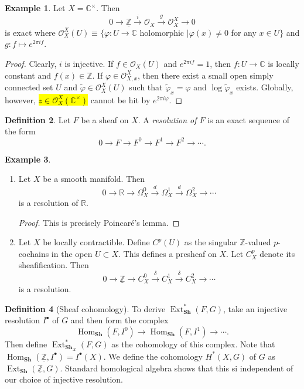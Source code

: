 \documentclass[10pt,letterpaper,cm]{nupset}
\theoremstyle{definition}
\newtheorem{definition}{Definition}[subsection]
\newtheorem{exmp}[definition]{Example}
\theoremstyle{theorem}
\theoremstyle{remark}
\newcommand{\C}{\mathbb C}
\newcommand{\R}{\mathbb{R}}
\newcommand{\Z}{\mathbb Z}
\newcommand{\1}{\mathbb{1}}
\newcommand{\0}{\vec 0}
\DeclareMathOperator{\ext}{Ext}
\DeclareMathOperator{\Hom}{Hom}
\begin{document}
\begin{exmp}
 Let $X = \C^{\times}$. Then $$ 0 \to \underline{\Z} \overset{i}{\longrightarrow} \mathcal{O}_X \overset{g}{\longrightarrow} \mathcal{O}_X^X \to 0$$ is exact where $\mathcal{O}_X^X(U) \equiv \{ \varphi : U \to \C$ holomorphic $\mid \varphi(x) \ne 0$ for any $x\in U\}$ and $g : f \mapsto e^{2\pi i f}$.
\end{exmp}
\begin{proof}
Clearly, $i$ is injective. If $f \in \mathcal{O}_X(U)$ and $e^{2\pi i f} =1$, then $f : U \to \C$ is locally constant and $f(x) \in \Z$. If $\varphi \in \mathcal{O}_{X,x}^X$, then there exist a small open simply connected set $U$ and $\tilde{\varphi} \in \mathcal{O}_X^X(U)$ such that $\tilde{\varphi}_x = \varphi$ and $\log{\tilde{\varphi}_x}$ exists. Globally, however, \hl{$z\in \mathcal{O}_X^X(\C^{\times})$} cannot be hit by $e^{2\pi i \varphi}$.
\end{proof}

\begin{definition}
Let $F$ be a sheaf on $X$. A \textit{resolution of $F$} is an exact sequence of the form $$0 \to F \to F^0 \to F^1 \to F^2 \to \cdots .$$
\end{definition}

\begin{exmp} $ $
\begin{enumerate}
\item Let $X$ be a smooth manifold. Then $$0 \to \R \to \Omega_X^0 \overset{d}{\longrightarrow} \Omega_X^1 \overset{d}{\longrightarrow} \Omega^2_X \to \cdots$$ is a resolution of $\R$.
\begin{proof}
This is precisely Poincar\'e's lemma.
\end{proof}
\item Let $X$ be locally contractible. Define $C^p(U)$ as the singular $\Z$-valued $p$-cochains in the open $U\subset X$. This defines a presheaf on $X$. Let $C^p_X$ denote its sheafification. Then $$0 \to \underline{\Z} \to C^0_X \overset{\delta}{\longrightarrow} C^1_X \overset{\delta}{\longrightarrow} C^2_X \to \cdots$$ is a resolution. 
\end{enumerate}
\end{exmp}

\begin{definition}[Sheaf cohomology]
 To derive $\ext^{\ast}_{\mathbf{Sh}}(F, G)$, take an injective resolution $I^{\bullet}$ of $G$ and then form the complex $$\Hom_{\mathbf{Sh}}(F, I^0) \to \Hom_{\mathbf{Sh}}(F, I^1) \to \cdots.$$ Then define $\ext^{\ast}_{\mathbf{Sh}_{X}}(F, G)$ as the cohomology of this complex. Note that $\Hom_{\mathbf{Sh}}(\underline{\Z}, I^{\bullet}) = I^{\bullet}(X)$. We define the cohomology $H^{\ast}(X, G)$ of $G$ as $\ext_{\mathbf{Sh}}(\underline{\Z}, G)$.  Standard homological algebra shows that this si independent of our choice of injective resolution.  
\end{definition}
\end{document}
